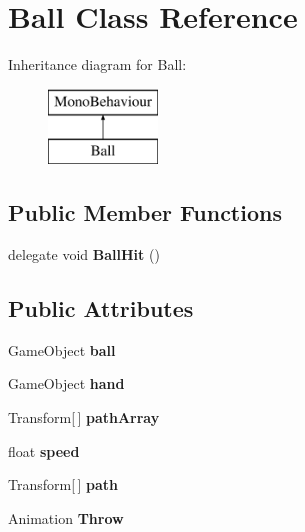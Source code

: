 \hypertarget{class_ball}{}\section{Ball Class Reference}
\label{class_ball}
Inheritance diagram for Ball\+:\begin{figure}[H]
\begin{center}
\leavevmode
\includegraphics[height=2.000000cm]{class_ball}
\end{center}
\end{figure}
\subsection*{Public Member Functions}
\begin{DoxyCompactItemize}
\item 
delegate void {\bfseries Ball\+Hit} ()\hypertarget{class_ball_aa7c5a9ef594c67b2e315ca6f9aa72946}{}\label{class_ball_aa7c5a9ef594c67b2e315ca6f9aa72946}

\end{DoxyCompactItemize}
\subsection*{Public Attributes}
\begin{DoxyCompactItemize}
\item 
Game\+Object {\bfseries ball}\hypertarget{class_ball_acad9ea662432b6ca6c5e64115950ac33}{}\label{class_ball_acad9ea662432b6ca6c5e64115950ac33}

\item 
Game\+Object {\bfseries hand}\hypertarget{class_ball_a65a5e30cf4fcda0dc4c9aebe888ef3fe}{}\label{class_ball_a65a5e30cf4fcda0dc4c9aebe888ef3fe}

\item 
Transform\mbox{[}$\,$\mbox{]} {\bfseries path\+Array}\hypertarget{class_ball_a60d5cb1763e8ef1e2931a95d0be72272}{}\label{class_ball_a60d5cb1763e8ef1e2931a95d0be72272}

\item 
float {\bfseries speed}\hypertarget{class_ball_abb8bc4c20b6a86a599a20661acb9a516}{}\label{class_ball_abb8bc4c20b6a86a599a20661acb9a516}

\item 
Transform\mbox{[}$\,$\mbox{]} {\bfseries path}\hypertarget{class_ball_a0767f4424644cb44aa5741e8e06d799b}{}\label{class_ball_a0767f4424644cb44aa5741e8e06d799b}

\item 
Animation {\bfseries Throw}\hypertarget{class_ball_a9e4d6879c0e6b04fa780e101ac82554f}{}\label{class_ball_a9e4d6879c0e6b04fa780e101ac82554f}

\end{DoxyCompactItemize}
